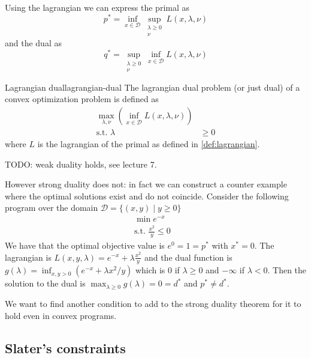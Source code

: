 \documentclass[12pt]{extarticle}
\begin{document}
Using the lagrangian we can express the primal as
\begin{equation}
	p^* = \inf_{x \in \mathcal D} \sup_{\substack{\lambda \geq 0 \\ \nu}} L(x, \lambda, \nu)
\end{equation}
and the dual as
\begin{equation}
	q^* = \sup_{\substack{\lambda \geq 0 \\ \nu}} \inf_{x \in \mathcal D} L(x, \lambda, \nu)
\end{equation}

\begin{definition}{Lagrangian dual}{lagrangian-dual}
	The lagrangian dual problem (or just dual) of a convex optimization problem is defined as
	\begin{align}
		\max_{\lambda, \nu} \left(\inf_{x\in \mathcal D} L(x, \lambda, \nu) \right) &        \\
		\text{s.t. }	\lambda                                                        & \geq 0
	\end{align}
	where $L$ is the lagrangian of the primal as defined in \cref{def:lagrangian}.
\end{definition}

TODO: weak duality holds, see lecture 7.

However strong duality does not: in fact we can construct a counter example where
the optimal solutions exist and do not coincide.
Consider the following program over the domain $\mathcal D = \{(x, y) \mid y \geq 0 \}$
\begin{align}
	\min e^{-x} & \\
	\text{s.t. }	\frac{x^2}{y} \leq 0
\end{align}
We have that the optimal objective value is $e^0 = 1 = p^*$ with $x^* = 0$.
The lagrangian is $L(x, y, \lambda) = e^{-x} + \lambda \frac{x^2}{y}$
and the dual function is $g(\lambda) = \inf_{x, y \gt 0} (e^{-x} + \lambda x^2/y)$
which is $0$ if $\lambda \geq 0$ and $-\infty$ if $\lambda < 0$.
Then the solution to the dual is $\max_{\lambda \geq 0} g(\lambda) = 0 = d^*$
and $p^* \neq d^*$.

We want to find another condition to add to the strong duality theorem for it to hold
even in convex programs.

\subsection{Slater's constraints}
\end{document}
